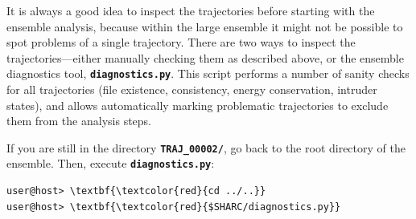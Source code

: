 \documentclass[a4paper,11pt,DIV=15,openany]{scrbook}
\newcommand{\ttt}[1]{\textbf{\texttt{#1}}}
\begin{document}
It is always a good idea to inspect the trajectories before starting with the ensemble analysis, because within the large ensemble it might not be possible to spot problems of a single trajectory.
There are two ways to inspect the trajectories---either manually checking them as described above, or the ensemble diagnostics tool, \ttt{diagnostics.py}.
This script performs a number of sanity checks for all trajectories (file existence, consistency, energy conservation, intruder states), and allows automatically marking problematic trajectories to exclude them from the analysis steps.

If you are still in the directory \ttt{TRAJ\_00002/}, go back to the root directory of the ensemble.
Then, execute \ttt{diagnostics.py}:
\begin{Verbatim}[commandchars=\\\{\}]
user@host> \textbf{\textcolor{red}{cd ../..}}
user@host> \textbf{\textcolor{red}{$SHARC/diagnostics.py}}
\end{Verbatim}
\end{document}
